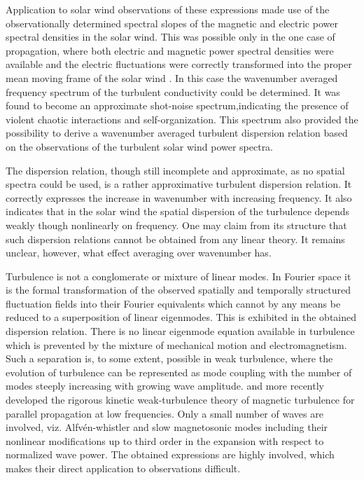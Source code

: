 \documentclass[ ]{copernicus2}
\begin{document}
{{{{Application to solar wind observations of these expressions made use of the observationally determined spectral slopes of the magnetic and electric power spectral densities in the solar wind. This was possible only in the one case of propagation, where both electric and magnetic power spectral densities were available and the electric fluctuations were correctly transformed into the proper mean moving frame of the solar wind \citep{chen2011}. In this case the wavenumber averaged frequency spectrum of the turbulent conductivity could be determined. It was found to become an approximate shot-noise spectrum,indicating the presence of violent chaotic interactions and self-organization. This spectrum also provided the possibility to derive a wavenumber averaged turbulent dispersion relation based on the observations of the turbulent solar wind power spectra.}

{The dispersion relation, though still incomplete and approximate, as no spatial spectra could be used, is a rather approximative turbulent dispersion relation. It correctly expresses the increase in wavenumber with increasing frequency. It also indicates that in the solar wind the spatial dispersion of the turbulence depends weakly though nonlinearly on frequency. One may claim from its structure that such dispersion relations cannot be obtained from any linear theory. It remains unclear, however, what effect averaging over wavenumber has.}

{Turbulence is not a conglomerate or mixture of linear modes. In Fourier space it is the formal transformation of the observed spatially and temporally structured fluctuation fields into their Fourier equivalents which cannot by any means be reduced to a superposition of linear eigenmodes. This is exhibited in the obtained dispersion relation. There is no linear eigenmode equation available in turbulence which is prevented by the mixture of mechanical motion and electromagnetism. Such a separation is, to some extent, possible in weak turbulence, where the evolution of turbulence can be represented as mode coupling with the number of modes steeply increasing with growing wave amplitude. \citet{yoon2007a} and \citet{yoon2007b} more recently developed the rigorous kinetic weak-turbulence theory of magnetic turbulence for parallel propagation at low frequencies. Only a small number of waves are involved, viz. Alfv\'en-whistler and slow magnetosonic modes including their nonlinear modifications up to third order in the expansion with respect to normalized wave power. The obtained expressions are highly involved, which makes their direct application to observations difficult.}

}}}
\end{document}
